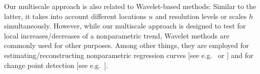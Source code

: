 Our multiscale approach is also related to Wavelet-based methods: Similar to the latter, it takes into account different locations $u$ and resolution levels or scales $h$ simultaneously. However, while our multiscale approach is designed to test for local increases/decreases of a nonparametric trend, Wavelet methods are commonly used for other purposes. Among other things, they are employed for estimating/reconstructing nonparametric regression curves [see e.g.\ \cite{Donoho1995} or \cite{vonSachsMacGibbon2000}] and for change point detection [see e.g.\ \citet{ChoFryzlewicz2012}]. 




